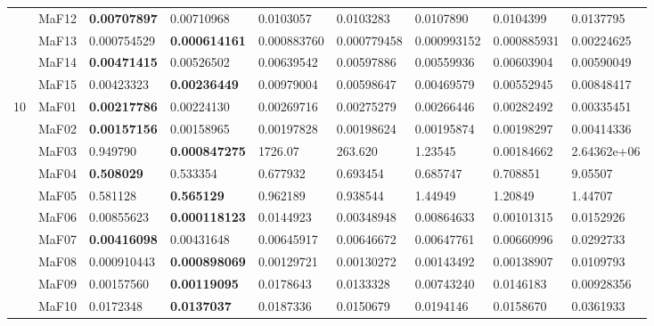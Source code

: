 \documentclass[]{article}
\begin{document}
\begin{landscape}
\begin{table}
\begin{footnotesize}
\begin{tabular}{|l|l|l|l|l|l|l|l|l|}
 & MaF12 & \cellcolor{gray95} {\bf 0.00707897} & \cellcolor{gray95} 0.00710968 & 0.0103057 & 0.0103283 & 0.0107890 & 0.0104399 & 0.0137795\\
 & MaF13 & \cellcolor{gray95} 0.000754529 & \cellcolor{gray95} {\bf 0.000614161} & 0.000883760 & \cellcolor{gray95} 0.000779458 & 0.000993152 & 0.000885931 & 0.00224625\\
 & MaF14 & \cellcolor{gray95} {\bf 0.00471415} & \cellcolor{gray95} 0.00526502 & 0.00639542 & 0.00597886 & 0.00559936 & 0.00603904 & 0.00590049\\
 & MaF15 & \cellcolor{gray95} 0.00423323 & \cellcolor{gray95} {\bf 0.00236449} & 0.00979004 & 0.00598647 & 0.00469579 & 0.00552945 & 0.00848417\\
\hline

\multirow{15}{*}{10} & MaF01 & \cellcolor{gray95} {\bf 0.00217786} & \cellcolor{gray95} 0.00224130 & 0.00269716 & 0.00275279 & 0.00266446 & 0.00282492 & 0.00335451\\
 & MaF02 & \cellcolor{gray95} {\bf 0.00157156} & \cellcolor{gray95} 0.00158965 & 0.00197828 & 0.00198624 & 0.00195874 & 0.00198297 & 0.00414336\\
 & MaF03 & 0.949790 & \cellcolor{gray95} {\bf 0.000847275} & 1726.07 & 263.620 & 1.23545 & \cellcolor{gray95} 0.00184662 & 2.64362e+06\\
 & MaF04 & \cellcolor{gray95} {\bf 0.508029} & \cellcolor{gray95} 0.533354 & 0.677932 & 0.693454 & 0.685747 & 0.708851 & 9.05507\\
 & MaF05 & \cellcolor{gray95} 0.581128 & \cellcolor{gray95} {\bf 0.565129} & 0.962189 & 0.938544 & 1.44949 & 1.20849 & 1.44707\\
 & MaF06 & 0.00855623 & \cellcolor{gray95} {\bf 0.000118123} & 0.0144923 & 0.00348948 & 0.00864633 & \cellcolor{gray95} 0.00101315 & 0.0152926\\
 & MaF07 & \cellcolor{gray95} {\bf 0.00416098} & \cellcolor{gray95} 0.00431648 & 0.00645917 & 0.00646672 & 0.00647761 & 0.00660996 & 0.0292733\\
 & MaF08 & \cellcolor{gray95} 0.000910443 & \cellcolor{gray95} {\bf 0.000898069} & 0.00129721 & 0.00130272 & 0.00143492 & 0.00138907 & 0.0109793\\
 & MaF09 & \cellcolor{gray95} 0.00157560 & \cellcolor{gray95} {\bf 0.00119095} & 0.0178643 & 0.0133328 & 0.00743240 & 0.0146183 & 0.00928356\\
 & MaF10 & 0.0172348 & \cellcolor{gray95} {\bf 0.0137037} & 0.0187336 & \cellcolor{gray95} 0.0150679 & 0.0194146 & \cellcolor{gray95} 0.0158670 & 0.0361933\\

\end{tabular}
\end{footnotesize}
\end{table}
\end{landscape}
\end{document}
